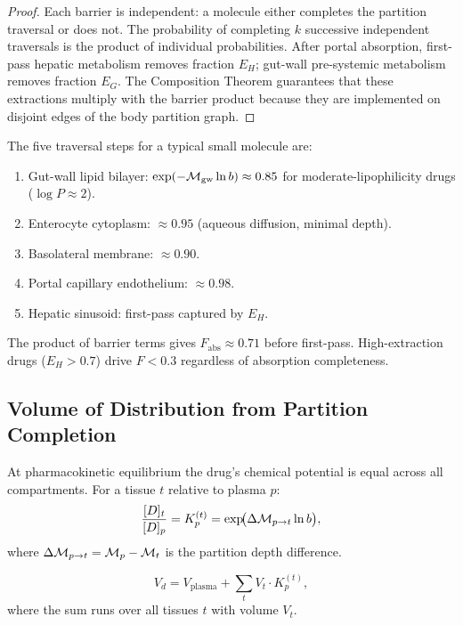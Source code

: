 \begin{proof}
Each barrier is independent: a molecule either completes the partition
traversal or does not.  The probability of completing $k$ successive
independent traversals is the product of individual probabilities.  After
portal absorption, first-pass hepatic metabolism removes fraction $E_H$;
gut-wall pre-systemic metabolism removes fraction $E_G$.  The Composition
Theorem guarantees that these extractions multiply with the barrier product
because they are implemented on disjoint edges of the body partition graph.
\end{proof}

The five traversal steps for a typical small molecule are:
\begin{enumerate}[leftmargin=2em,label=(\arabic*)]
  \item Gut-wall lipid bilayer: $\exp(-\mathcal{M}_{\mathrm{gw}}\ln b) \approx 0.85$
    for moderate-lipophilicity drugs ($\log P \approx 2$).
  \item Enterocyte cytoplasm: $\approx 0.95$ (aqueous diffusion, minimal depth).
  \item Basolateral membrane: $\approx 0.90$.
  \item Portal capillary endothelium: $\approx 0.98$.
  \item Hepatic sinusoid: first-pass captured by $E_H$.
\end{enumerate}
The product of barrier terms gives $F_{\mathrm{abs}} \approx 0.71$ before
first-pass.  High-extraction drugs ($E_H > 0.7$) drive $F < 0.3$ regardless
of absorption completeness.

\subsection{Volume of Distribution from Partition Completion}
\label{subsec:ch09-vd}

At pharmacokinetic equilibrium the drug's chemical potential is equal across
all compartments.  For a tissue $t$ relative to plasma $p$:
\begin{equation}
  \frac{[D]_t}{[D]_p} = K_p^{(t)} = \exp\!\bigl(\Delta\mathcal{M}_{p\to t}\ln b\bigr),
  \label{eq:ch09-Kp}
\end{equation}
where $\Delta\mathcal{M}_{p\to t} = \mathcal{M}_p - \mathcal{M}_t$ is the partition depth
difference.

\begin{theorem}
\label{thm:ch09-Vd-ext}
\begin{equation}
  V_d = V_{\mathrm{plasma}} + \sum_{t} V_t\cdot K_p^{(t)},
  \label{eq:ch09-Vd-ext}
\end{equation}
where the sum runs over all tissues $t$ with volume $V_t$.
\end{theorem}

